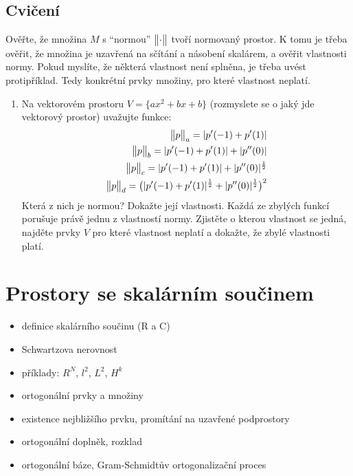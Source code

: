 \subsection{Cvičení}
 Ověřte, že množina $M$ s ``normou'' $\bigl\Vert\cdot\bigr\Vert$ tvoří normovaný prostor. K tomu je třeba ověřit,
 že množina je uzavřená na sčítání a násobení skalárem, a ověřit vlastnosti normy. Pokud myslíte, že některá vlastnost 
 není splněna, je třeba uvést protipříklad. Tedy konkrétní prvky množiny, pro které vlastnost neplatí.

\begin{enumerate}
 \item Na vektorovém prostoru $V=\{ ax^2 + bx + b\}$ (rozmyslete se o jaký jde vektorový prostor) uvažujte funkce:
       \begin{align*}
          \bigl\Vert p\bigr\Vert_a =  \lvert p'(-1) + p'(1)\rvert \\ 
          \bigl\Vert p\bigr\Vert_b = \lvert p'(-1) + p'(1)\rvert + \lvert p''(0)\rvert \\
          \bigl\Vert p\bigr\Vert_c = \lvert p'(-1) + p'(1)\rvert + \lvert p''(0)\rvert^{\frac12} \\
          \bigl\Vert p\bigr\Vert_d = \big(\lvert p'(-1) + p'(1)\rvert^\frac12 + \lvert p''(0)\rvert^\frac12\big)^2  
       \end{align*}
       Která z nich je normou? Dokažte její vlastnosti. Každá ze zbylých funkcí porušuje právě jednu z vlastností normy. Zjistěte o kterou vlastnost se jedná,
       najděte prvky $V$ pro které vlastnost neplatí a dokažte, že zbylé vlastnosti platí.
        
 \end{enumerate}

\section{Prostory se skalárním součinem}
\begin{itemize}
 \item definice skalárního součinu (R a C)
 \item Schwartzova nerovnost
 \item příklady: $R^N$, $l^2$, $L^2$, $H^k$
 \item ortogonální prvky a množiny
 \item existence nejbližšího prvku, promítání na uzavřené podprostory
 \item ortogonální doplněk, rozklad
 \item ortogonální báze, Gram-Schmidtův ortogonalizační proces
\end{itemize}

